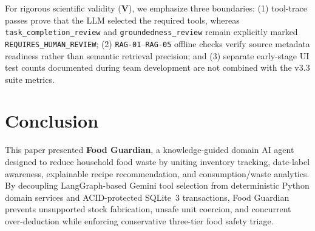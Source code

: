 \documentclass[conference]{IEEEtran}
\begin{document}
\begin{table}[t]
\centering
\caption{Recorded Live Gemini Multi-Tool Evaluation Results (v3.3)}
\label{tab:live}
\footnotesize
\setlength{\tabcolsep}{4pt}
\end{table}

For rigorous scientific validity (\textbf{V}), we emphasize three boundaries: (1) tool-trace passes prove that the LLM selected the required tools, whereas \texttt{task\_completion\_review} and \texttt{groundedness\_review} remain explicitly marked \texttt{REQUIRES\_HUMAN\_REVIEW}; (2) \texttt{RAG-01}--\texttt{RAG-05} offline checks verify source metadata readiness rather than semantic retrieval precision; and (3) separate early-stage UI test counts documented during team development are not combined with the v3.3 suite metrics.

\section{Conclusion}

This paper presented \textbf{Food Guardian}, a knowledge-guided domain AI agent designed to reduce household food waste by uniting inventory tracking, date-label awareness, explainable recipe recommendation, and consumption/waste analytics. By decoupling LangGraph-based Gemini tool selection from deterministic Python domain services and ACID-protected SQLite~3 transactions, Food Guardian prevents unsupported stock fabrication, unsafe unit coercion, and concurrent over-deduction while enforcing conservative three-tier food safety triage.
\end{document}

